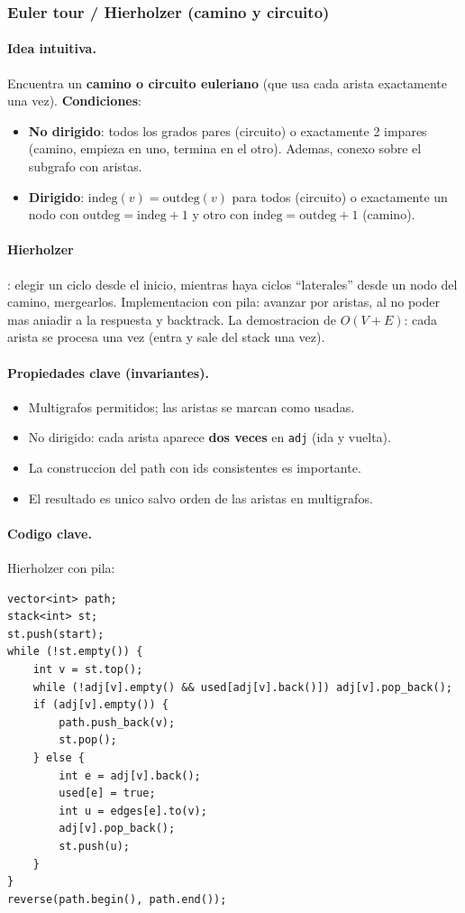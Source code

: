 ﻿\subsubsection{Euler tour / Hierholzer (camino y circuito)}

\paragraph{Idea intuitiva.}
Encuentra un \textbf{camino o circuito euleriano} (que usa cada arista exactamente una vez). \textbf{Condiciones}:
\begin{itemize}\setlength\itemsep{0pt}
	\item \textbf{No dirigido}: todos los grados pares (circuito) o exactamente 2 impares (camino, empieza en uno, termina en el otro). Ademas, conexo sobre el subgrafo con aristas.
	\item \textbf{Dirigido}: $\text{indeg}(v) = \text{outdeg}(v)$ para todos (circuito) o exactamente un nodo con $\text{outdeg} = \text{indeg} + 1$ y otro con $\text{indeg} = \text{outdeg} + 1$ (camino).
\end{itemize}

\paragraph{Hierholzer}: elegir un ciclo desde el inicio, mientras haya ciclos ``laterales'' desde un nodo del camino, mergearlos. Implementacion con pila: avanzar por aristas, al no poder mas aniadir a la respuesta y backtrack. La demostracion de $O(V + E)$: cada arista se procesa una vez (entra y sale del stack una vez).

\paragraph{Propiedades clave (invariantes).}
\begin{itemize}\setlength\itemsep{0pt}
	\item Multigrafos permitidos; las aristas se marcan como usadas.
	\item No dirigido: cada arista aparece \textbf{dos veces} en \texttt{adj} (ida y vuelta).
	\item La construccion del path con ids consistentes es importante.
	\item El resultado es unico salvo orden de las aristas en multigrafos.
\end{itemize}

\paragraph{Codigo clave.}
Hierholzer con pila:
\begin{verbatim}
vector<int> path;
stack<int> st;
st.push(start);
while (!st.empty()) {
    int v = st.top();
    while (!adj[v].empty() && used[adj[v].back()]) adj[v].pop_back();
    if (adj[v].empty()) {
        path.push_back(v);
        st.pop();
    } else {
        int e = adj[v].back();
        used[e] = true;
        int u = edges[e].to(v);
        adj[v].pop_back();
        st.push(u);
    }
}
reverse(path.begin(), path.end());
\end{verbatim}


